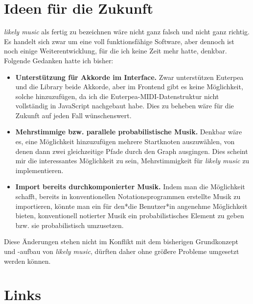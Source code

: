 \documentclass[a4paper,twocolumn]{article}
\begin{document}
\section*{Ideen für die Zukunft}

{\it likely music} als fertig zu bezeichnen wäre nicht ganz falsch und nicht
ganz richtig. Es handelt sich zwar um eine voll funktionsfähige Software, aber
dennoch ist noch einige Weiterentwicklung, für die ich keine Zeit mehr hatte,
denkbar. Folgende Gedanken hatte ich
bisher:

\begin{itemize}
  \item {\bf Unterstützung für Akkorde im Interface.} Zwar unterstützen Euterpea
    und die Library beide Akkorde, aber im Frontend gibt es keine Möglichkeit,
    solche hinzuzufügen, da ich die Euterpea-MIDI-Datenstruktur nicht
    vollständig in JavaScript nachgebaut habe. Dies zu beheben wäre für die
    Zukunft auf jeden Fall wünschenswert.
  \item {\bf Mehrstimmige bzw. parallele probabilistische Musik.} Denkbar wäre
    es, eine Möglichkeit hinzuzufügen mehrere Startknoten auszuwählen, von denen
    dann zwei gleichzeitige Pfade durch den Graph ausgingen. Dies scheint mir
    die interessantes Möglichkeit zu sein, Mehrstimmigkeit für {\it likely music}
    zu implementieren.
  \item {\bf Import bereits durchkomponierter Musik.} Indem man die Möglichkeit
    schafft, bereits in
    konventionellen Notationsprogrammen erstellte Musik zu importieren, könnte man
    ein für den*die Benutzer*in angenehme Möglichkeit bieten, konventionell
    notierter Musik ein probabilistisches Element zu geben bzw. sie
    probabilistisch umzusetzen.
\end{itemize}

Diese Änderungen stehen nicht im Konflikt mit dem bisherigen Grundkonzept und -aufbau von
{\it likely music}, dürften daher ohne größere Probleme umgesetzt werden können.

\section*{Links}
\end{document}
